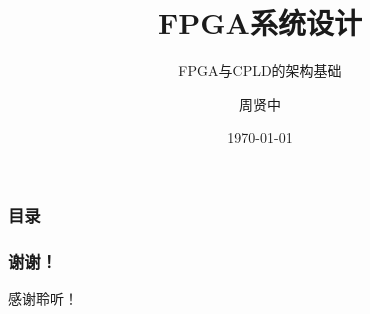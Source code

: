 \documentclass{beamer}
\title{FPGA系统设计}
\subtitle{FPGA与CPLD的架构基础}
\author{周贤中}
\institute{广东工业大学集成电路学院}
\date{\today}
\begin{document}
\begin{frame}
\titlepage
\end{frame}

\begin{frame}
\frametitle{目录}
\tableofcontents
\end{frame}










\begin{frame}
\centering
\frametitle{谢谢！}
感谢聆听！
\end{frame}
\end{document}
